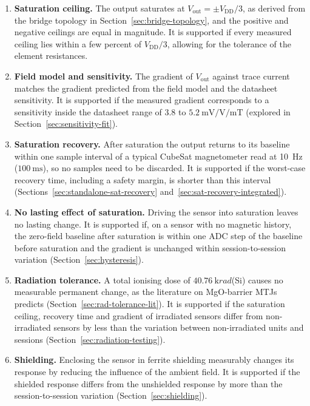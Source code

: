 \documentclass[12pt,a4paper]{article}
\begin{document}
\begin{enumerate}[label=\textbf{H\arabic*:}, leftmargin=*]
\item \textbf{Saturation ceiling.} The output saturates at $V_{\text{out}} = \pm V_{\text{DD}}/3$, as derived from the bridge topology in Section~\ref{sec:bridge-topology}, and the positive and negative ceilings are equal in magnitude. It is supported if every measured ceiling lies within a few percent of $V_{\text{DD}}/3$, allowing for the tolerance of the element resistances.

\item \textbf{Field model and sensitivity.} The gradient of $V_{\text{out}}$ against trace current matches the gradient predicted from the field model and the datasheet sensitivity. It is supported if the measured gradient corresponds to a sensitivity inside the datasheet range of 3.8 to $\SI{5.2}{\milli\volt\per\volt\per\milli\tesla}$ (explored in Section~\ref{sec:sensitivity-fit}).

\item \textbf{Saturation recovery.} After saturation the output returns to its baseline within one sample interval of a typical CubeSat magnetometer read at \SI{10}{\hertz} ($\SI{100}{\milli\second}$), so no samples need to be discarded. It is supported if the worst-case recovery time, including a safety margin, is shorter than this interval (Sections~\ref{sec:standalone-sat-recovery} and~\ref{sec:sat-recovery-integrated}).

\item \textbf{No lasting effect of saturation.} Driving the sensor into saturation leaves no lasting change. It is supported if, on a sensor with no magnetic history, the zero-field baseline after saturation is within one ADC step of the baseline before saturation and the gradient is unchanged within session-to-session variation (Section~\ref{sec:hysteresis}).

\item \textbf{Radiation tolerance.} A total ionising dose of $\SI{40.76}{\kilo rad}$(Si) causes no measurable permanent change, as the literature on MgO-barrier MTJs predicts (Section~\ref{sec:rad-tolerance-lit}). It is supported if the saturation ceiling, recovery time and gradient of irradiated sensors differ from non-irradiated sensors by less than the variation between non-irradiated units and sessions (Section~\ref{sec:radiation-testing}).

\item \textbf{Shielding.} Enclosing the sensor in ferrite shielding measurably changes its response by reducing the influence of the ambient field. It is supported if the shielded response differs from the unshielded response by more than the session-to-session variation (Section~\ref{sec:shielding}).
\end{enumerate}
\end{document}
